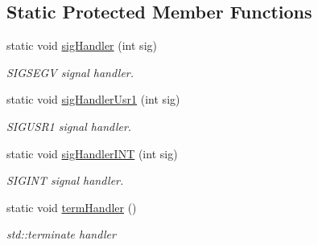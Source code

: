 \subsection*{Static Protected Member Functions}
\begin{DoxyCompactItemize}
\item 
static void \hyperlink{structvt_1_1runtime_1_1_runtime_a15fd3d8eb4952deca7488ff4fa07258c}{sig\+Handler} (int sig)
\begin{DoxyCompactList}\small\item\em S\+I\+G\+S\+E\+GV signal handler. \end{DoxyCompactList}\item 
static void \hyperlink{structvt_1_1runtime_1_1_runtime_a833f09083e671080fb8ae1a44bc50321}{sig\+Handler\+Usr1} (int sig)
\begin{DoxyCompactList}\small\item\em S\+I\+G\+U\+S\+R1 signal handler. \end{DoxyCompactList}\item 
static void \hyperlink{structvt_1_1runtime_1_1_runtime_a3ce54aa1371a6448670e06049a0985c4}{sig\+Handler\+I\+NT} (int sig)
\begin{DoxyCompactList}\small\item\em S\+I\+G\+I\+NT signal handler. \end{DoxyCompactList}\item 
static void \hyperlink{structvt_1_1runtime_1_1_runtime_abe295b9ea216fafe2b494e2bc609f8fb}{term\+Handler} ()
\begin{DoxyCompactList}\small\item\em std\+::terminate handler \end{DoxyCompactList}\end{DoxyCompactItemize}
